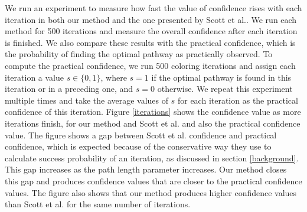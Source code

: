 \documentclass{ws-procs11x85}
\begin{document}
\begin{figure}[h]
{}
\end{figure}


We run an experiment to measure how fast the value of confidence rises with each
iteration in both our method and the one presented by Scott et al.\cite{scott}.
We run each method for 500 iterations and measure the overall confidence after
each iteration is finished. We also compare these results with the practical
confidence, which is the probability of finding the optimal pathway as
practically observed. To compute the practical confidence, we run 500
coloring iterations and assign each iteration a value $s \in \{0, 1\}$, where
$s = 1$ if the optimal pathway is found in this iteration or in a preceding one,
and $s = 0$ otherwise. We repeat this experiment multiple times and take the
average values of $s$ for each iteration as the practical confidence of this
iteration. Figure \ref{iterations} shows the confidence value as more iterations
finish, for our method and Scott et al. and also the practical confidence value.
The figure shows a gap between Scott et al. confidence and practical confidence,
which is expected because of the conservative way they use to calculate success
probability of an iteration, as discussed in section \ref{background}. This gap
increases as the path length parameter increases. Our method closes this gap and
produces confidence values that are closer to the practical confidence values.
The figure also shows that our method produces higher confidence values than
Scott et al. for the same number of iterations.
\end{document}
